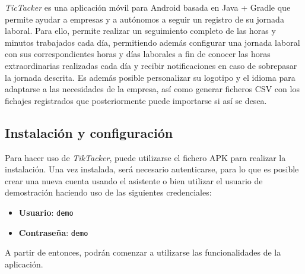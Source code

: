 \textit{TicTacker} es una aplicación móvil para Android basada en Java + Gradle que permite ayudar a empresas y a autónomos a seguir un registro de su jornada laboral. Para ello, permite realizar un seguimiento completo de las horas y minutos trabajados cada día, permitiendo además configurar una jornada laboral con sus correspondientes horas y días laborales a fin de conocer las horas extraordinarias realizadas cada día y recibir notificaciones en caso de sobrepasar la jornada descrita. Es además posible personalizar su logotipo y el idioma para adaptarse a las necesidades de la empresa, así como generar ficheros CSV con los fichajes registrados que posteriormente puede importarse si así se desea.

\subsection{Instalación y configuración}

Para hacer uso de \textit{TikTacker}, puede utilizarse el fichero APK para realizar la instalación. Una vez instalada, será necesario autenticarse, para lo que es posible crear una nueva cuenta usando el asistente o bien utilizar el usuario de demostración haciendo uso de las siguientes credenciales:

\begin{itemize}
    \item \textbf{Usuario}: \texttt{demo}
    \item \textbf{Contraseña}: \texttt{demo}
\end{itemize}

A partir de entonces, podrán comenzar a utilizarse las funcionalidades de la aplicación.